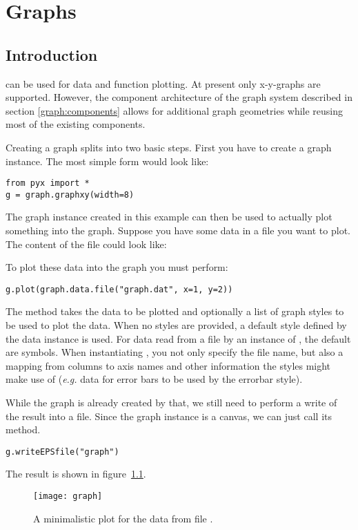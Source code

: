\chapter{Graphs}
\label{graph}
\section{Introduction} %
\PyX{} can be used for data and function plotting. At present only
x-y-graphs are supported. However, the component architecture of the
graph system described in section \ref{graph:components} allows for
additional graph geometries while reusing most of the existing
components.

Creating a graph splits into two basic steps. First you have to create
a graph instance. The most simple form would look like:
\begin{verbatim}
from pyx import *
g = graph.graphxy(width=8)
\end{verbatim}
The graph instance  created in this example can then be used
to actually plot something into the graph. Suppose you have some data
in a file  you want to plot. The content of the file
could look like:

To plot these data into the graph  you must perform:
\begin{verbatim}
g.plot(graph.data.file("graph.dat", x=1, y=2))
\end{verbatim}
The method  takes the data to be plotted and optionally
a list of graph styles to be used to plot the data. When no styles are
provided, a default style defined by the data instance is used. For
data read from a file by an instance of , the
default are symbols. When instantiating , you
not only specify the file name, but also a mapping from columns to
axis names and other information the styles might make use of
(\emph{e.g.} data for error bars to be used by the errorbar style).

While the graph is already created by that, we still need to perform a
write of the result into a file. Since the graph instance is a canvas,
we can just call its  method.
\begin{verbatim}
g.writeEPSfile("graph")
\end{verbatim}
The result  is shown in figure~\ref{fig:graph}.

\begin{figure}[ht]
\centerline{\texttt{[image: graph]}}
\caption{A minimalistic plot for the data from file .}
\label{fig:graph}
\end{figure}

